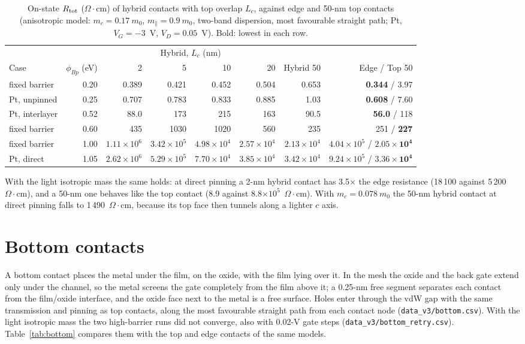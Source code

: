 \documentclass[11pt]{article}
\providecommand{\ohmcm}{\ensuremath{\Omega\cdot\mathrm{cm}}}
\providecommand{\ohmcm}{\ensuremath{\Omega\cdot\mathrm{cm}}}
\begin{document}
\begin{table}[!htbp]
\centering
\caption{On-state $R_{\rm tot}$ (\ohmcm) of hybrid contacts with top overlap $L_c$, against edge and 50-nm top contacts (anisotropic model: $m_c=0.17~m_0$, $m_\parallel=0.9~m_0$, two-band dispersion, most favourable straight path; Pt, $V_G=-3$~V, $V_D=0.05$~V). Bold: lowest in each row.}
\label{tab:hybrid}\footnotesize\setlength{\tabcolsep}{3pt}
\begin{tabular}{lrrrrrrr}
\toprule
 & & \multicolumn{4}{c}{Hybrid, $L_c$ (nm)} & & \\
Case & $\phi_{Bp}$ (eV) & 2 & 5 & 10 & 20 & Hybrid 50 & Edge / Top 50 \\
\midrule
fixed barrier & 0.20 & 0.389 & 0.421 & 0.452 & 0.504 & 0.653 & \textbf{0.344} / 3.97 \\
Pt, unpinned & 0.25 & 0.707 & 0.783 & 0.833 & 0.885 & 1.03 & \textbf{0.608} / 7.60 \\
Pt, interlayer & 0.52 & 88.0 & 173 & 215 & 163 & 90.5 & \textbf{56.0} / 118 \\
fixed barrier & 0.60 & 435 & 1030 & 1020 & 560 & 235 & 251 / \textbf{227} \\
fixed barrier & 1.00 & $1.11\times10^6$ & $3.42\times10^5$ & $4.98\times10^4$ & $2.57\times10^4$ & $2.13\times10^4$ & $4.04\times10^5$ / $\mathbf{2.05\times10^4}$ \\
Pt, direct & 1.05 & $2.62\times10^6$ & $5.29\times10^5$ & $7.70\times10^4$ & $3.85\times10^4$ & $3.42\times10^4$ & $9.24\times10^5$ / $\mathbf{3.36\times10^4}$ \\
\bottomrule
\end{tabular}
\end{table}

With the light isotropic mass the same holds: at direct pinning a 2-nm hybrid contact has 3.5$\times$ the edge resistance (18\,100 against 5\,200~\ohmcm), and a 50-nm one behaves like the top contact (8.9 against 8.8$\times10^5$~\ohmcm). With $m_c=0.078~m_0$ the 50-nm hybrid contact at direct pinning falls to 1\,490~\ohmcm, because its top face then tunnels along a lighter $c$ axis.

\section{Bottom contacts}
\label{sec:bottom}
A bottom contact places the metal under the film, on the oxide, with the film lying over it. In the mesh the oxide and the back gate extend only under the channel, so the metal screens the gate completely from the film above it; a 0.25-nm free segment separates each contact from the film/oxide interface, and the oxide face next to the metal is a free surface. Holes enter through the vdW gap with the same transmission and pinning as top contacts, along the most favourable straight path from each contact node (\texttt{data\_v3/bottom.csv}). With the light isotropic mass the two high-barrier runs did not converge, also with 0.02-V gate steps (\texttt{data\_v3/bottom\_retry.csv}). Table~\ref{tab:bottom} compares them with the top and edge contacts of the same models.
\end{document}
